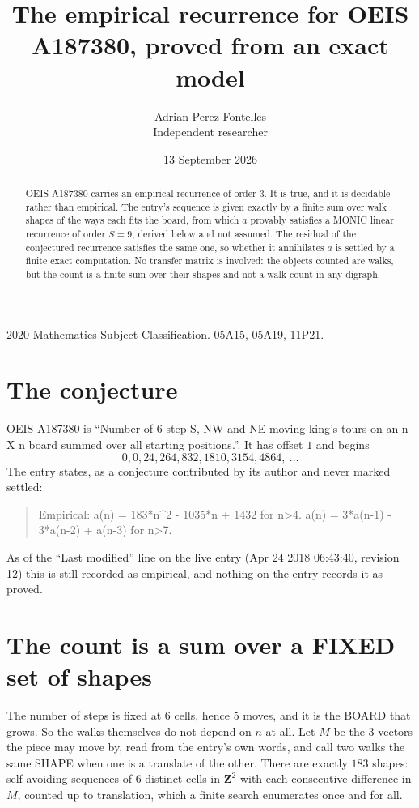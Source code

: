 \documentclass[11pt,a4paper]{article}
\title{The empirical recurrence for OEIS A187380, proved from an exact model}
\author{Adrian Perez Fontelles\\ \small Independent researcher}
\date{13 September 2026}
\theoremstyle{plain}
\theoremstyle{definition}
\begin{document}
\maketitle

\begin{abstract}
OEIS A187380 carries an empirical recurrence of order $3$. It is true, and it is
decidable rather than empirical. The entry's sequence is given exactly by a finite sum over walk shapes of the ways each fits the board, from
which $a$ provably satisfies a MONIC linear recurrence of order $S=9$, derived below and not
assumed. The residual of the conjectured recurrence satisfies the same one, so whether it
annihilates $a$ is settled by a finite exact computation. No transfer matrix is involved: the objects counted are walks, but the count is a finite sum over their shapes and not a walk count in any digraph.
\end{abstract}

\noindent\small 2020 Mathematics Subject Classification. 05A15, 05A19, 11P21.\normalsize

\section{The conjecture}

OEIS A187380 is ``Number of 6-step S, NW and NE-moving king's tours on an n X n board summed over all starting positions.''. It has offset $1$ and begins
\[
0, 0, 24, 264, 832, 1810, 3154, 4864,\ \dots
\]
The entry states, as a conjecture contributed by its author and never marked settled:
\begin{quote}
Empirical: a(n) = 183*n\^{}2 - 1035*n + 1432 for n>4. a(n) = 3*a(n-1) - 3*a(n-2) + a(n-3) for n>7.
\end{quote}
As of the ``Last modified'' line on the live entry (Apr 24 2018 06:43:40, revision 12)
this is still recorded as empirical, and nothing on the entry records it as proved.

\section{The count is a sum over a FIXED set of shapes}

The number of steps is fixed at $6$ cells, hence $5$ moves, and it is the BOARD
that grows. So the walks themselves do not depend on $n$ at all. Let $M$ be the $3$
vectors the piece may move by, read from the entry's own words, and call two walks the same
SHAPE when one is a translate of the other. There are exactly $183$ shapes: self-avoiding
sequences of $6$ distinct cells in $\mathbf{Z}^{2}$ with each consecutive difference in
$M$, counted up to translation, which a finite search enumerates once and for all.
\end{document}
